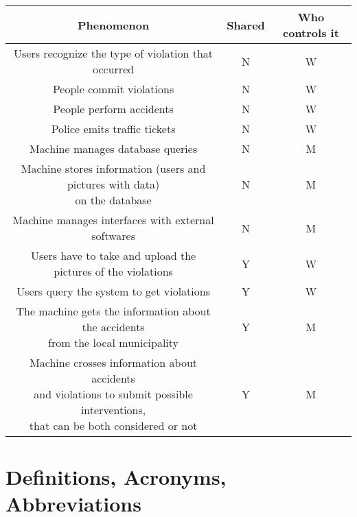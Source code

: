 \documentclass[../RASD.tex]{subfiles}
\begin{document}
    \newpage
    \begin{center}
        \begin{tabular}{ ||c|c|c|| }

            \hline
            \textbf{Phenomenon} & \textbf{Shared} & \textbf{Who controls it} \\ \hline
            Users recognize the type of violation that occurred & N & W \\ \hline
            People commit violations & N & W\\ \hline
            People perform accidents & N & W\\ \hline
            Police emits traffic tickets & N & W\\ \hline
            Machine manages database queries & N & M\\ \hline
            \makecell{Machine stores information (users and pictures with data)
            \\ on the database} & N & M\\ \hline
            Machine manages interfaces with external softwares & N & M\\ \hline
            Users have to take and upload the pictures of the violations & Y & W\\ \hline
            Users query the system to get violations & Y & W\\ \hline
            \makecell{The machine gets the information about the accidents
            \\from the local municipality} & Y & M\\ \hline
            \makecell{Machine crosses information about accidents
            \\and violations to submit possible interventions,
            \\that can be both considered or not} & Y & M\\
            \hline
        \end{tabular}
    \end{center}

    \section{Definitions, Acronyms, Abbreviations}\label{sec:definitions,-acronyms,-abbreviations}
\end{document}
